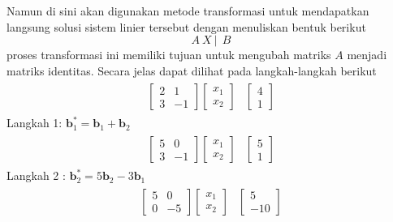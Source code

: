 	
	Namun di sini akan digunakan metode transformasi untuk mendapatkan langsung solusi sistem linier tersebut dengan menuliskan bentuk berikut
	$$A~X~|~~B$$
	proses transformasi ini memiliki tujuan untuk mengubah matriks $A$ menjadi matriks identitas. Secara jelas dapat dilihat pada langkah-langkah berikut
		\begin{align*}
		\begin{array}{r|r} 
			\left[
			\begin{array}{rr} 
				2 & 1 \\
				3 & -1 
			\end{array} 
			\right] \left[
			\begin{array}{r} 
				x_1 \\ 
				x_2  
			\end{array}
			\right]  &  \left[
			\begin{array}{r} 
				4\\
				1 
			\end{array} 
			\right]
		\end{array}
	\end{align*}
	Langkah 1: $\textbf{b}^*_1= \textbf{b}_1 + \textbf{b}_2$ \\
		\begin{align*}
		\begin{array}{r|r} 
			\left[
			\begin{array}{rr} 
				5 & 0 \\
				3 & -1 
			\end{array} 
			\right] \left[
			\begin{array}{r} 
				x_1 \\ 
				x_2  
			\end{array}
			\right]  &  \left[
			\begin{array}{r} 
				5\\
				1 
			\end{array} 
			\right]
		\end{array}
	\end{align*}
	Langkah 2 : $\textbf{b}^*_2= 5\textbf{b}_2 - 3\textbf{b}_1$ \\
		\begin{align*}
		\begin{array}{r|r} 
			\left[
			\begin{array}{rr} 
				5 & 0 \\
				0 & -5 
			\end{array} 
			\right] \left[
			\begin{array}{r} 
				x_1 \\ 
				x_2 
			\end{array}
			\right]  &  \left[
			\begin{array}{r} 
				5\\
				-10 
			\end{array} 
			\right]
		\end{array}
	\end{align*}
